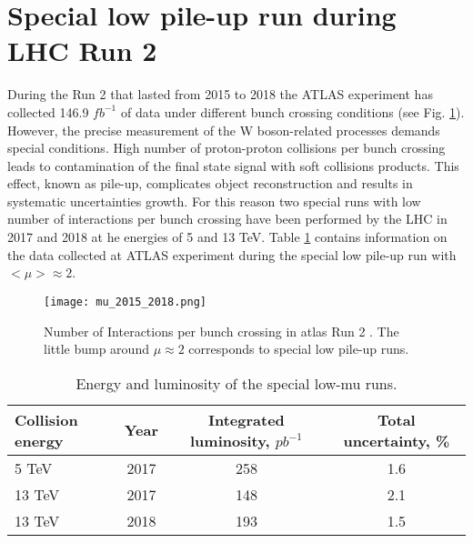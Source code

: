         \section{Special low pile-up run during LHC Run 2}
        During the Run 2 that lasted from 2015 to 2018 the ATLAS experiment has collected 146.9 $fb^{-1}$ of data under different bunch crossing conditions (see Fig. \ref{fig::run2lumi}). However, the precise measurement of the W boson-related processes demands special conditions. High number of proton-proton collisions per bunch crossing leads to contamination of the final state signal with soft collisions products. This effect, known as pile-up, complicates object reconstruction and results in systematic uncertainties growth. For this reason two special runs with low number of interactions per bunch crossing have been performed by the LHC in 2017 and 2018 at he energies of 5 and 13 TeV. Table \ref{tab:lowmu} contains information on the data collected at ATLAS experiment during the special low pile-up run with $<\mu> \approx 2$.\\
		 \begin{figure}[htpb]
			\texttt{[image: mu\_2015\_2018.png]}
			\caption{ Number of Interactions per bunch crossing in \gls{atlas} Run 2 \cite{run2lumi}. The little bump around $\mu \approx 2$ corresponds to special low pile-up runs.}
			\label{fig::run2lumi}
			\end{figure}
			\begin{table}
			\centering			
			\begin{tabular}{|l|c|c|c|}
			\hline
			\textbf{Collision energy} & \textbf{Year}& \textbf{Integrated luminosity, $pb^{-1}$ }&  Total uncertainty, \%\\
			\hline
			5 TeV  & 2017 & 258& 1.6\\
			13 TeV  & 2017 & 148& 2.1 \\
			13 TeV  & 2018 & 193& 1.5\\
			\hline
			\end{tabular}
			\caption{Energy and luminosity of the special low-mu runs.}
			\label{tab:lowmu}
			\end{table}